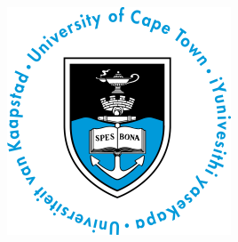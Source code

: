 \documentclass[
11pt,
oneside, 
english,
singlespacing,
headsepline, 
fleqn
]{MastersDoctoralThesis}
\author{Devon \textsc{Stone}} %
\begin{document}
\frontmatter %
\pagestyle{plain} %


\begin{titlepage}
\begin{center}

\vspace*{.06\textheight}
{\scshape\huge \univname\par}\vspace{1cm} %
\includegraphics[width=0.5\textwidth]{images/logo.png}\\[0.6cm] %
\HRule \\[0.4cm] %
{\huge \bfseries \ttitle\par}\vspace{0.4cm} %
\HRule \\[1cm] %
 

\end{center}
\end{titlepage}
\end{document}
